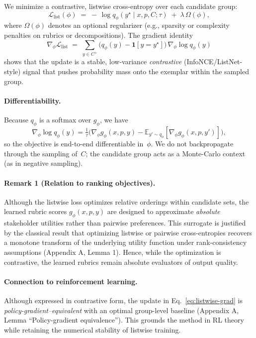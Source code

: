 \documentclass[sigconf]{acmart}
\begin{document}
We minimize a contrastive, listwise cross-entropy over each candidate group:
\begin{equation}
\mathcal{L}_{\mathrm{list}}(\phi)
\;=\;
-\,\log q_\phi(y^\star\mid x,p,C;\tau)
\;+\;
\lambda\,\Omega(\phi),
\label{eq:listwise}
\end{equation}
where $\Omega(\phi)$ denotes an optional regularizer
(e.g., sparsity or complexity penalties on rubrics or decompositions).  
The gradient identity
\begin{equation}
\nabla_\phi \mathcal{L}_{\mathrm{list}}
\;=\;
\sum_{y\in C^+}
\Big(q_\phi(y)-\mathbf{1}[y=y^\star]\Big)\,
\nabla_\phi \log q_\phi(y)
\label{eq:listwise-grad}
\end{equation}
shows that the update is a stable, low-variance
\emph{contrastive} (InfoNCE/ListNet-style) signal that pushes
probability mass onto the exemplar within the sampled group.

\paragraph{Differentiability.}
Because $q_\phi$ is a softmax over $g_\phi$, we have
\[
\nabla_\phi \log q_\phi(y)
=\tfrac{1}{\tau}\Big(\nabla_\phi g_\phi(x,p,y)
- \mathbb{E}_{y'\sim q_\phi}[\nabla_\phi g_\phi(x,p,y')]\Big),
\]
so the objective is end-to-end differentiable in~$\phi$.
We do not backpropagate through the sampling of~$C$;
the candidate group acts as a Monte-Carlo context
(as in negative sampling).

\paragraph{Remark 1 (Relation to ranking objectives).}
Although the listwise loss optimizes relative orderings within candidate sets, 
the learned rubric scores $g_\phi(x,p,y)$ are designed to approximate 
\emph{absolute} stakeholder utilities rather than pairwise preferences. 
This surrogate is justified by the classical result that optimizing 
listwise or pairwise cross-entropies recovers a monotone transform of the 
underlying utility function under rank-consistency assumptions 
(Appendix A, Lemma 1). 
Hence, while the optimization is contrastive, the learned rubrics remain 
absolute evaluators of output quality.

\paragraph{Connection to reinforcement learning.}
Although expressed in contrastive form, the update in
Eq.~\eqref{eq:listwise-grad} is \emph{policy-gradient–equivalent}
with an optimal group-level baseline (Appendix A, Lemma “Policy-gradient equivalence”).
This grounds the method in RL theory while retaining the numerical stability
of listwise training.
\end{document}
